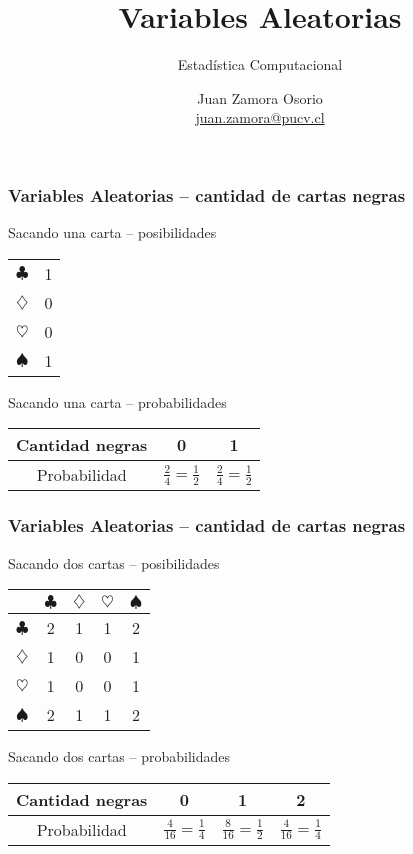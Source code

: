 \documentclass[table]{beamer}
\title{Variables Aleatorias}
\subtitle{Estadística Computacional}
\author[J.Z.O-2025]{Juan Zamora Osorio\\\url{juan.zamora@pucv.cl}}
\institute[PUCV]{Instituto de Estadística\\Pontificia Universidad Cat\'olica de Valpara\'iso}
\date{}
\begin{document}
\frame{\titlepage}



\begin{frame}
    \frametitle{Variables Aleatorias -- cantidad de cartas negras}
    \begin{block}{Sacando una carta -- posibilidades}
        \begin{center}
            \begin{tabular}{c|c}
                $\clubsuit$ & 1 \\
                $\diamondsuit$ & 0 \\
                $\heartsuit$ & 0 \\
                $\spadesuit$ & 1
            \end{tabular}
        \end{center}
    \end{block}
    \begin{block}{Sacando una carta -- probabilidades}
        \begin{center}
            \begin{tabular}{c|c|c}
                Cantidad negras & 0 & 1 \\
                \hline
                Probabilidad & $\frac{2}{4} = \frac{1}{2}$ & $\frac{2}{4} = \frac{1}{2}$
            \end{tabular}
        \end{center}
    \end{block}
\end{frame}

\begin{frame}
    \frametitle{Variables Aleatorias -- cantidad de cartas negras}
    \begin{block}{Sacando dos cartas -- posibilidades}
        \begin{center}
            \begin{tabular}{c|cccc}
                & $\clubsuit$ & $\diamondsuit$ & $\heartsuit$ & $\spadesuit$ \\
                \hline
                $\clubsuit$ & 2 & 1 & 1 & 2 \\
                $\diamondsuit$ & 1 & 0 & 0 & 1 \\
                $\heartsuit$ & 1 & 0 & 0 & 1 \\
                $\spadesuit$ & 2 & 1 & 1 & 2
            \end{tabular}
        \end{center}
    \end{block}
    \begin{block}{Sacando dos cartas -- probabilidades}
        \begin{center}
            \begin{tabular}{c|c|c|c}
                Cantidad negras & 0 & 1 & 2 \\
                \hline
                Probabilidad & $\frac{4}{16} = \frac{1}{4}$ &
                $\frac{8}{16} = \frac{1}{2}$ &
                $\frac{4}{16} = \frac{1}{4}$
            \end{tabular}
        \end{center}
    \end{block}
\end{frame}
\end{document}
